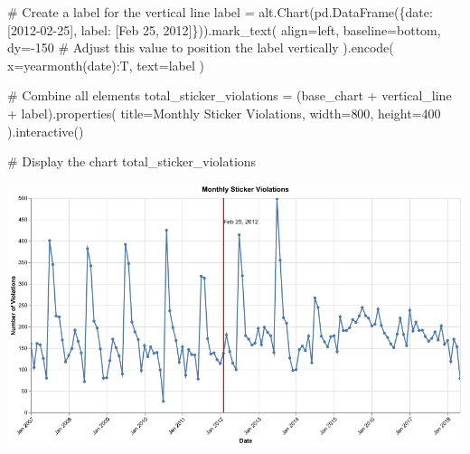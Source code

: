 \documentclass[
  letterpaper,
  DIV=11,
  numbers=noendperiod]{scrartcl}
\newenvironment{Shaded}{\begin{snugshade}}{\end{snugshade}}
\newcommand{\CommentTok}[1]{\textcolor[rgb]{0.37,0.37,0.37}{#1}}
\newcommand{\DecValTok}[1]{\textcolor[rgb]{0.68,0.00,0.00}{#1}}
\newcommand{\NormalTok}[1]{\textcolor[rgb]{0.00,0.23,0.31}{#1}}
\newcommand{\OperatorTok}[1]{\textcolor[rgb]{0.37,0.37,0.37}{#1}}
\newcommand{\StringTok}[1]{\textcolor[rgb]{0.13,0.47,0.30}{#1}}
\begin{document}
\begin{Shaded}
\begin{Highlighting}[]
\CommentTok{\# Create a label for the vertical line}
\NormalTok{label }\OperatorTok{=}\NormalTok{ alt.Chart(pd.DataFrame(\{}\StringTok{\textquotesingle{}date\textquotesingle{}}\NormalTok{: [}\StringTok{\textquotesingle{}2012{-}02{-}25\textquotesingle{}}\NormalTok{], }\StringTok{\textquotesingle{}label\textquotesingle{}}\NormalTok{: [}\StringTok{\textquotesingle{}Feb 25, 2012\textquotesingle{}}\NormalTok{]\})).mark\_text(}
\NormalTok{    align}\OperatorTok{=}\StringTok{\textquotesingle{}left\textquotesingle{}}\NormalTok{,}
\NormalTok{    baseline}\OperatorTok{=}\StringTok{\textquotesingle{}bottom\textquotesingle{}}\NormalTok{,}
\NormalTok{    dy}\OperatorTok{={-}}\DecValTok{150}  \CommentTok{\# Adjust this value to position the label vertically}
\NormalTok{).encode(}
\NormalTok{    x}\OperatorTok{=}\StringTok{\textquotesingle{}yearmonth(date):T\textquotesingle{}}\NormalTok{,}
\NormalTok{    text}\OperatorTok{=}\StringTok{\textquotesingle{}label\textquotesingle{}}
\NormalTok{)}

\CommentTok{\# Combine all elements}
\NormalTok{total\_sticker\_violations }\OperatorTok{=}\NormalTok{ (base\_chart }\OperatorTok{+}\NormalTok{ vertical\_line }\OperatorTok{+}\NormalTok{ label).properties(}
\NormalTok{    title}\OperatorTok{=}\StringTok{\textquotesingle{}Monthly Sticker Violations\textquotesingle{}}\NormalTok{,}
\NormalTok{    width}\OperatorTok{=}\DecValTok{800}\NormalTok{,}
\NormalTok{    height}\OperatorTok{=}\DecValTok{400}
\NormalTok{).interactive()}

\CommentTok{\# Display the chart}
\NormalTok{total\_sticker\_violations}
\end{Highlighting}
\end{Shaded}

\includegraphics{ps2_files/figure-pdf/cell-11-output-1.png}
\end{document}
